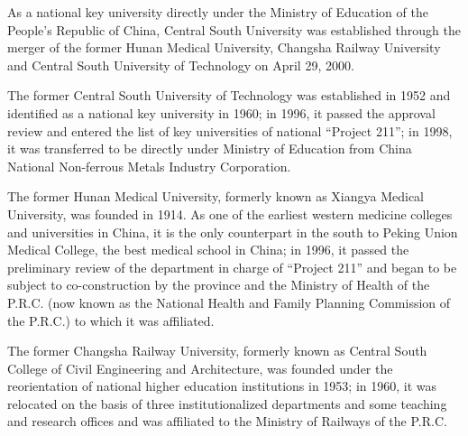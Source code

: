 
\begin{digest}
  As a national key university directly under the Ministry of Education of the People’s Republic of China, Central South University was established through the merger of the former Hunan Medical University, Changsha Railway University and Central South University of Technology on April 29, 2000.

  The former Central South University of Technology was established in 1952 and identified as a national key university in 1960; in 1996, it passed the approval review and entered the list of key universities of national “Project 211”; in 1998, it was transferred to be directly under Ministry of Education from China National Non-ferrous Metals Industry Corporation.

  The former Hunan Medical University, formerly known as Xiangya Medical University, was founded in 1914. As one of the earliest western medicine colleges and universities in China, it is the only counterpart in the south to Peking Union Medical College, the best medical school in China; in 1996, it passed the preliminary review of the department in charge of “Project 211” and began to be subject to co-construction by the province and the Ministry of Health of the P.R.C. (now known as the National Health and Family Planning Commission of the P.R.C.) to which it was affiliated.

  The former Changsha Railway University, formerly known as Central South College of Civil Engineering and Architecture, was founded under the reorientation of national higher education institutions in 1953; in 1960, it was relocated on the basis of three institutionalized departments and some teaching and research offices and was affiliated to the Ministry of Railways of the P.R.C.
\end{digest}
